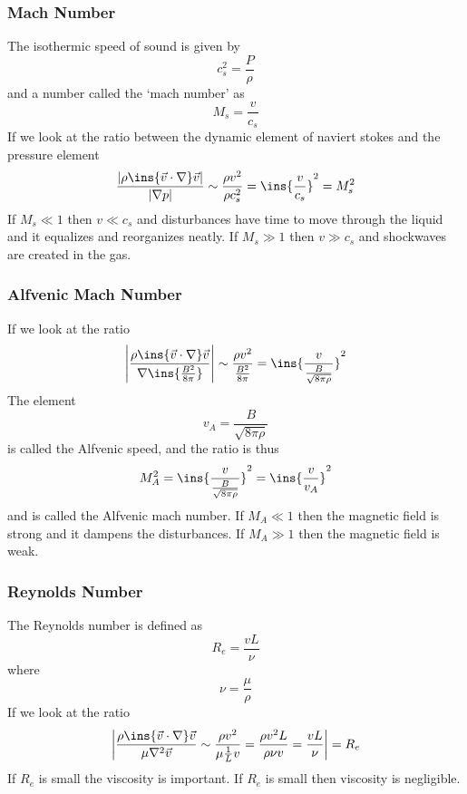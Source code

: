 \subsubsection{Mach Number}
The isothermic speed of sound is given by
\begin{equation}
    c_s^2 = \frac{P}{\rho}
\end{equation}
and a number called the `mach number' as 
\begin{equation}
    M_s = \frac{v}{c_s}
\end{equation}
If we look at the ratio between the dynamic element of naviert stokes and the pressure element
\begin{equation}
    \frac{\lvert\rho\ins{\vec{v}\cdot\nabla}\vec{v}\rvert}{\lvert\nabla p\rvert} \sim \frac{\rho v^2}{\rho c_s^2} = \ins{\frac{v}{c_s}}^2 = M_s^2
\end{equation}
If \(M_s \ll 1\) then \(v\ll c_s\) and disturbances have time to move through the liquid and it equalizes and reorganizes neatly. If \(M_s \gg 1\) then \(v \gg c_s\) and shockwaves are created in the gas.
\subsubsection{Alfvenic Mach Number}
If we look at the ratio 
\begin{equation}
    \left\lvert\frac{\rho\ins{\vec{v}\cdot\nabla}\vec{v}}{\nabla\ins{\frac{B^2}{8\pi}}}\right\rvert \sim \frac{\rho v^2}{\frac{B^2}{8\pi}}=\ins{\frac{v}{\frac{B}{\sqrt{8\pi\rho}}}}^2
\end{equation}
The element
\begin{equation}
    v_A = \frac{B}{\sqrt{8\pi\rho}}
\end{equation}
is called the Alfvenic speed, and the ratio is thus
\begin{equation}
    M_A^2 = \ins{\frac{v}{\frac{B}{\sqrt{8\pi\rho}}}}^2 = \ins{\frac{v}{v_A}}^2
\end{equation}
and is called the Alfvenic mach number. If \(M_A \ll 1\) then the magnetic field is strong and it dampens the disturbances. If \(M_A \gg 1\) then the magnetic field is weak.
\subsubsection{Reynolds Number}
The Reynolds number is defined as
\begin{equation}
    R_e = \frac{vL}{\nu}
\end{equation}
where
\begin{equation}
    \nu = \frac{\mu}{\rho}
\end{equation}
If we look at the ratio
\begin{equation}
    \left\lvert\frac{\rho\ins{\vec{v}\cdot\nabla}\vec{v}}{\mu\nabla^2\vec{v}} \sim \frac{\rho v^2}{\mu\frac{1}{L}v} = \frac{\rho v^2 L}{\rho \nu v} = \frac{vL}{\nu}\right\rvert = R_e
\end{equation}
If \(R_e\) is small the viscosity is important. If \(R_e\) is small then viscosity is negligible.
